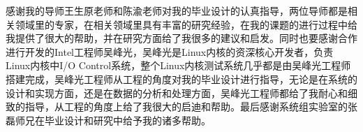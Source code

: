 
\begin{ack}
感谢我的导师王生原老师和陈渝老师对我的毕业设计的认真指导，两位导师都是相关领域里的专家，在相关领域里具有丰富的研究经验，在我的课题的进行过程中给我提供了很大的帮助，并在研究方面给了我很多的建议和启发。同时也要感谢合作进行开发的Intel工程师吴峰光，吴峰光是Linux内核的资深核心开发者，负责Linux内核中I/O Control系统，整个Linux内核测试系统几乎都是由吴峰光工程师搭建完成，吴峰光工程师从工程的角度对我的毕业设计进行指导，无论是在系统的设计和实现方面，还是在数据的分析和处理方面，吴峰光工程师都给了我耐心和细致的指导，从工程的角度上给了我很大的启迪和帮助。最后感谢系统组实验室的张磊师兄在毕业设计和研究中给予我的诸多帮助。
\end{ack}
